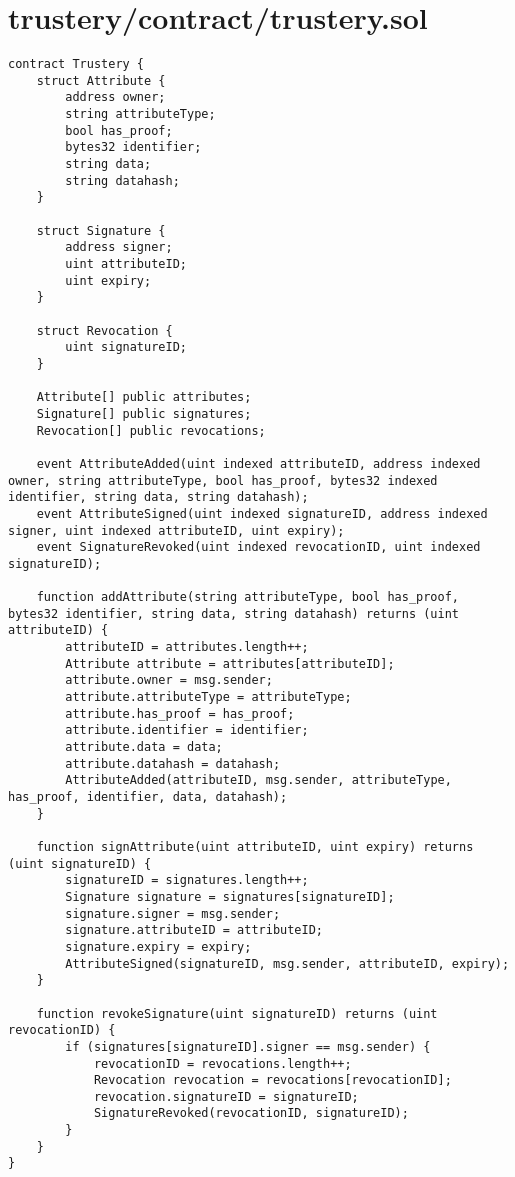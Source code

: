 \documentclass[12pt]{report}
\begin{document}
	\section{trustery/contract/trustery.sol}
	\begin{lstlisting}
contract Trustery {
    struct Attribute {
        address owner;
        string attributeType;
        bool has_proof;
        bytes32 identifier;
        string data;
        string datahash;
    }

    struct Signature {
        address signer;
        uint attributeID;
        uint expiry;
    }

    struct Revocation {
        uint signatureID;
    }

    Attribute[] public attributes;
    Signature[] public signatures;
    Revocation[] public revocations;

    event AttributeAdded(uint indexed attributeID, address indexed owner, string attributeType, bool has_proof, bytes32 indexed identifier, string data, string datahash);
    event AttributeSigned(uint indexed signatureID, address indexed signer, uint indexed attributeID, uint expiry);
    event SignatureRevoked(uint indexed revocationID, uint indexed signatureID);

    function addAttribute(string attributeType, bool has_proof, bytes32 identifier, string data, string datahash) returns (uint attributeID) {
        attributeID = attributes.length++;
        Attribute attribute = attributes[attributeID];
        attribute.owner = msg.sender;
        attribute.attributeType = attributeType;
        attribute.has_proof = has_proof;
        attribute.identifier = identifier;
        attribute.data = data;
        attribute.datahash = datahash;
        AttributeAdded(attributeID, msg.sender, attributeType, has_proof, identifier, data, datahash);
    }

    function signAttribute(uint attributeID, uint expiry) returns (uint signatureID) {
        signatureID = signatures.length++;
        Signature signature = signatures[signatureID];
        signature.signer = msg.sender;
        signature.attributeID = attributeID;
        signature.expiry = expiry;
        AttributeSigned(signatureID, msg.sender, attributeID, expiry);
    }

    function revokeSignature(uint signatureID) returns (uint revocationID) {
        if (signatures[signatureID].signer == msg.sender) {
            revocationID = revocations.length++;
            Revocation revocation = revocations[revocationID];
            revocation.signatureID = signatureID;
            SignatureRevoked(revocationID, signatureID);
        }
    }
}
	\end{lstlisting}
	
\end{document}
